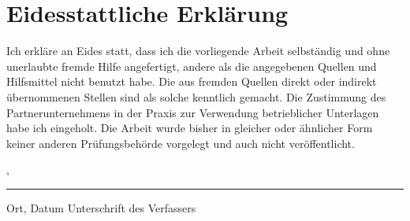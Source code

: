 \thispagestyle{empty}
\section*{Eidesstattliche Erklärung}
Ich erkläre an Eides statt, dass ich die vorliegende Arbeit selbständig und ohne unerlaubte fremde Hilfe angefertigt, andere als die angegebenen Quellen und Hilfsmittel nicht benutzt habe. Die aus fremden Quellen direkt oder indirekt übernommenen Stellen sind als solche kenntlich gemacht.
Die Zustimmung des Partnerunternehmens in der Praxis zur Verwendung betrieblicher Unterlagen habe ich eingeholt.
Die Arbeit wurde bisher in gleicher oder ähnlicher Form keiner anderen Prüfungsbehörde vorgelegt und auch nicht veröffentlicht.

    
\vspace{20mm}

\begin{flushleft}
    \mylocation, \mysdate \hfill
    \rule{\textwidth}{0.4pt}
    Ort, Datum
    \hfill
    Unterschrift des Verfassers
\end{flushleft}